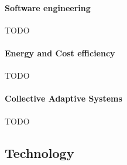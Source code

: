 \documentclass[12pt]{article}
\begin{document}
\paragraph{Software engineering}
TODO

\paragraph{Energy and Cost efficiency}
TODO

\paragraph{Collective Adaptive Systems}
TODO

\subsection{Technology}\label{subsec:technology}
\end{document}
